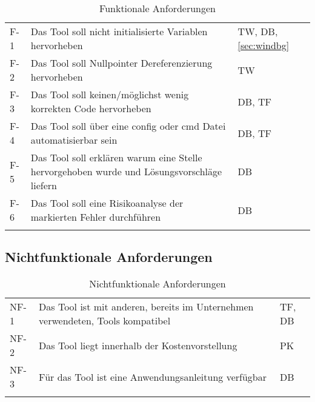 \begin{longtable}{lL{10cm}l}
            \toprule
              & 
             & 
                          \\
            \midrule
            \endhead
            F-1 & 
            Das Tool soll nicht initialisierte Variablen hervorheben       & 
            TW, DB, \ref{sec:windbg} \\
            \midrule
            F-2 & 
            Das Tool soll Nullpointer Dereferenzierung hervorheben     & 
            TW                       \\
            \midrule
            F-3 & 
            Das Tool soll keinen/möglichst wenig korrekten Code hervorheben      & 
            DB, TF                   \\
            \midrule
            F-4 & 
            Das Tool soll über eine config oder cmd Datei automatisierbar sein & 
            DB, TF                   \\
            \midrule
            F-5 & 
            Das Tool soll erklären warum eine Stelle hervorgehoben wurde und Lösungsvorschläge liefern & 
            DB                       \\
            \midrule
            F-6 & 
            Das Tool soll eine Risikoanalyse der markierten Fehler durchführen& 
            DB                       \\
            \bottomrule
    \caption{Funktionale Anforderungen}
    \label{tab:funktional}
\end{longtable}

\subsection{Nichtfunktionale Anforderungen}
\label{subsec:nichtfunktional}

\begin{longtable}{lL{10cm}l}
    \toprule
      & 
     & 
                  \\
    \midrule
    \endhead
    NF-1 & Das Tool ist mit anderen, bereits im Unternehmen verwendeten, Tools kompatibel & TF, DB      \\
    \midrule
    NF-2 & Das Tool liegt innerhalb der Kostenvorstellung                                 & PK          \\
    \midrule
    NF-3 & Für das Tool ist eine Anwendungsanleitung verfügbar                            & DB          \\
    \bottomrule
    \caption{Nichtfunktionale Anforderungen}
    \label{tab:nichtfunktional}
\end{longtable}